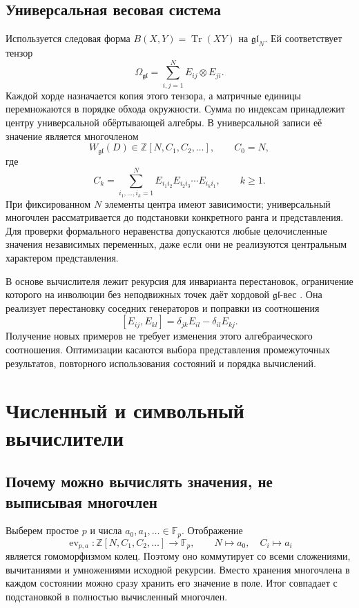 \documentclass[11pt,a4paper]{article}
\numberwithin{equation}{section}
\theoremstyle{definition}
\theoremstyle{remark}
\newcommand{\gl}{\mathfrak{gl}}
\newcommand{\W}{W_{\gl}}
\newcommand{\F}{\mathbb F}
\newcommand{\Z}{\mathbb Z}
\newcommand{\Tr}{\operatorname{Tr}}
\begin{document}
\subsection{Универсальная весовая система}

Используется следовая форма $B(X,Y)=\Tr(XY)$ на $\gl_N$.
Ей соответствует тензор
\[
 \Omega_{\gl}=\sum_{i,j=1}^N E_{ij}\otimes E_{ji}.
\]
Каждой хорде назначается копия этого тензора, а матричные единицы
перемножаются в порядке обхода окружности. Сумма по индексам принадлежит
центру универсальной обёртывающей алгебры. В универсальной записи её
значение является многочленом
\[
 \W(D)\in\Z[N,C_1,C_2,\ldots],\qquad C_0=N,
\]
где
\begin{equation}\label{eq:casimir}
 C_k=\sum_{i_1,\ldots,i_k=1}^N
 E_{i_1i_2}E_{i_2i_3}\cdots E_{i_ki_1},\qquad k\ge1.
\end{equation}
При фиксированном $N$ элементы центра имеют зависимости; универсальный
многочлен рассматривается до подстановки конкретного ранга и представления.
Для проверки формального неравенства допускаются любые целочисленные
значения независимых переменных, даже если они не реализуются центральным
характером представления.

В основе вычислителя лежит рекурсия для инварианта перестановок,
ограничение которого на инволюции без неподвижных точек даёт хордовой
$\gl$-вес \cite{yang}. Она реализует перестановку соседних генераторов
и поправки из соотношения
\begin{equation}\label{eq:commutator}
 [E_{ij},E_{kl}]=\delta_{jk}E_{il}-\delta_{il}E_{kj}.
\end{equation}
Получение новых примеров не требует изменения этого алгебраического
соотношения. Оптимизации касаются выбора представления промежуточных
результатов, повторного использования состояний и порядка вычислений.

\section{Численный и символьный вычислители}

\subsection{Почему можно вычислять значения, не выписывая многочлен}

Выберем простое $p$ и числа $a_0,a_1,\ldots\in\F_p$.
Отображение
\[
 \operatorname{ev}_{p,a}:\Z[N,C_1,C_2,\ldots]\longrightarrow\F_p,
 \qquad N\mapsto a_0,\quad C_i\mapsto a_i
\]
является гомоморфизмом колец. Поэтому оно коммутирует со всеми
сложениями, вычитаниями и умножениями исходной рекурсии. Вместо хранения
многочлена в каждом состоянии можно сразу хранить его значение в поле.
Итог совпадает с подстановкой в полностью вычисленный многочлен.
\end{document}
